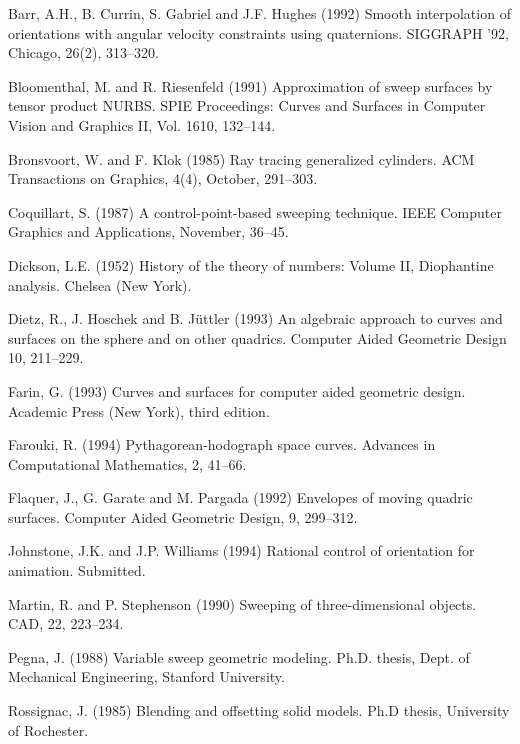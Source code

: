 
\begin{thebibliography}{Shoemake 85}

Barr, A.H., B. Currin, S. Gabriel and J.F. Hughes (1992)
Smooth interpolation of orientations with angular velocity
constraints using quaternions.  SIGGRAPH '92, Chicago, 26(2), 313--320.

Bloomenthal, M. and R. Riesenfeld (1991)
Approximation of sweep surfaces by tensor product NURBS.
SPIE Proceedings: Curves and Surfaces in Computer Vision and Graphics II,
Vol. 1610, 132--144.

Bronsvoort, W. and F. Klok (1985)
Ray tracing generalized cylinders.
ACM Transactions on Graphics, 4(4), October, 291--303.

Coquillart, S. (1987)
A control-point-based sweeping technique.
IEEE Computer Graphics and Applications, November, 36--45.

Dickson, L.E. (1952) History of the theory of numbers: Volume II,
Diophantine analysis.  Chelsea (New York).

Dietz, R., J. Hoschek and B. J\"{u}ttler (1993)
An algebraic approach to curves and surfaces on the sphere and on other
quadrics.  Computer Aided Geometric Design 10, 211--229.

Farin, G. (1993) Curves and surfaces for computer aided geometric design.
Academic Press (New York), third edition.

Farouki, R. (1994)
Pythagorean-hodograph space curves.
Advances in Computational Mathematics, 2, 41--66.

Flaquer, J., G. Garate and M. Pargada (1992)
Envelopes of moving quadric surfaces.
Computer Aided Geometric Design, 9, 299--312.

Johnstone, J.K. and J.P. Williams (1994) Rational control of orientation
for animation.  Submitted.

Martin, R. and P. Stephenson (1990)
Sweeping of three-dimensional objects.
CAD, 22, 223--234.

Pegna, J. (1988) Variable sweep geometric modeling.
Ph.D. thesis, Dept. of Mechanical Engineering, Stanford University.

Rossignac, J. (1985)
Blending and offsetting solid models.
Ph.D thesis, University of Rochester.


\end{thebibliography}
